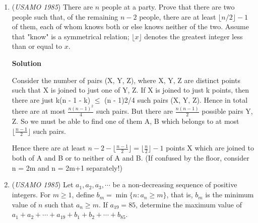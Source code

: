 \begin{enumerate}
 For $\theta < 45$, $\sin{\theta} \leq \cos{\theta}$. We know that the derivative of $\sin{\theta}$ is $\cos{\theta}$, and the derivative of $\cos{\theta}$ is $-\sin{\theta}$. Thus, the derivative of $\sin{\theta} + \cos{\theta}$ is $\cos{\theta} - \sin{\theta}$, which is nonnegative between $0^{\circ}$ and $45^{\circ}$. Thus, we can conclude that this is an increasing function on this range. 

 It must be true that $2\sin{\theta} \leq 1$, so $\theta \leq 30^{\circ}$. But, because $\sin{\theta} + \cos{\theta}$ is increasing, it is maximized at $\theta = 30^{\circ}$. Thus, $AB = \sqrt{3}$, $CD = 1$, and our sum is $5 + \sqrt{3}$.

 


	\item (\textit{USAMO 1985}) There are $n$ people at a party. Prove that there are two people such that, of the remaining $n-2$ people, there are at least $\lfloor n/2\rfloor -1$ of them, each of whom knows both or else  knows neither of the two. Assume that "know" is a symmetrical relation; $\lfloor x\rfloor$ denotes the greatest integer less than or equal to $x$.


 



\textbf{Solution}

Consider the number of pairs (X, {Y, Z}), where X, Y, Z are distinct points such that X is joined to just one of Y, Z. If X is joined to just k points, then there are just k(n - 1 - k) $\leq$ (n - 1)2/4 such pairs (X, {Y, Z}). Hence in total there are at most $\frac{n(n - 1)^2}{4}$ such pairs. But there are $\frac{n(n - 1)}{2}$ possible pairs {Y, Z}. So we must be able to find one of them {A, B} which belongs to at most $\lfloor \frac{n-1}{2} \rfloor$ such pairs. 

 Hence there are at least $n - 2 - \lfloor \frac{n - 1}{2} \rfloor = \lfloor \frac{n}{2} \rfloor - 1$ points X which are joined to both of A and B or to neither of A and B. (If confused by the floor, consider n = 2m and n = 2m+1 separately!)

 


	\item (\textit{USAMO 1985}) Let $a_1,a_2,a_3,\cdots$ be a non-decreasing sequence of positive integers. For $m\ge1$, define $b_m=\min\{n: a_n \ge m\}$, that is, $b_m$ is the minimum value of $n$ such that $a_n\ge m$. If $a_{19}=85$, determine the maximum value of
$a_1+a_2+\cdots+a_{19}+b_1+b_2+\cdots+b_{85}$.



\end{enumerate}
